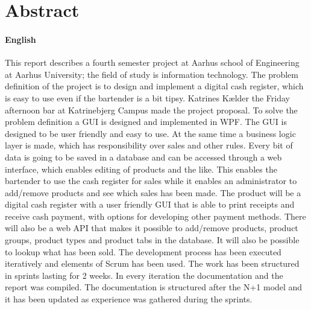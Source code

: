\chapter{Abstract}

\subsubsection*{English}

This report describes a fourth semester project at Aarhus school of Engineering at Aarhus University; 
the field of study is information technology. 
The problem definition of the project is to design and implement a digital cash register, which is easy to use even if the bartender is a bit tipsy. 
Katrines Kælder the Friday afternoon bar at Katrinebjerg Campus made the project proposal.
\newline
\newline
To solve the problem definition a \gls{GUI} is designed and implemented in \gls{WPF}. 
The \gls{GUI} is designed to be user friendly and easy to use.
At the same time a business logic layer is made, which has responsibility over sales and other rules. 
Every bit of data is going to be saved in a database and can be accessed through a web interface, which enables editing of products and the like. 
This enables the bartender to use the cash register for sales while it enables an administrator to add/remove products and see which sales has been made. 
\newline
\newline
The product will be a digital cash register with a user friendly \gls{GUI} that is able to print receipts and receive cash payment, with options for developing other payment methods. 
There will also be a web API that makes it possible to add/remove products, product groups, product types and product tabs in the database. 
It will also be possible to lookup what has been sold. 
\newline
\newline
The development process has been executed iteratively and elements of Scrum has been used. 
The work has been structured in sprints lasting for 2 weeks. 
In every iteration the documentation and the report was compiled. 
The documentation is structured after the N+1 model and it has been updated as experience was gathered during the sprints. 